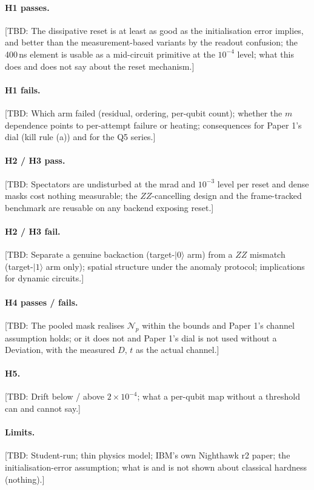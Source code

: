 \documentclass[aps,pra,reprint,superscriptaddress,nofootinbib,longbibliography,amsmath,amssymb]{revtex4-2}
\newcommand{\tbd}[1]{\textcolor{orange!80!black}{[TBD: #1]}}
\newcommand{\Np}{\mathcal{N}_p}
\begin{document}
\paragraph{H1 passes.} \tbd{The dissipative reset is at least as good as the initialisation error implies, and better than the measurement-based variants by the readout confusion; the 400\,ns element is usable as a mid-circuit primitive at the $10^{-4}$ level; what this does and does not say about the reset mechanism.}
\paragraph{H1 fails.} \tbd{Which arm failed (residual, ordering, per-qubit count); whether the $m$ dependence points to per-attempt failure or heating; consequences for Paper 1's dial (kill rule (a)) and for the Q5 series.}
\paragraph{H2 / H3 pass.} \tbd{Spectators are undisturbed at the mrad and $10^{-3}$ level per reset and dense masks cost nothing measurable; the $ZZ$-cancelling design and the frame-tracked benchmark are reusable on any backend exposing reset.}
\paragraph{H2 / H3 fail.} \tbd{Separate a genuine backaction (target-$|0\rangle$ arm) from a $ZZ$ mismatch (target-$|1\rangle$ arm only); spatial structure under the anomaly protocol; implications for dynamic circuits.}
\paragraph{H4 passes / fails.} \tbd{The pooled mask realises $\Np$ within the bounds and Paper 1's channel assumption holds; or it does not and Paper 1's dial is not used without a Deviation, with the measured $D$, $t$ as the actual channel.}
\paragraph{H5.} \tbd{Drift below / above $2\times10^{-4}$; what a per-qubit map without a threshold can and cannot say.}
\paragraph{Limits.} \tbd{Student-run; thin physics model; IBM's own Nighthawk r2 paper; the initialisation-error assumption; what is and is not shown about classical hardness (nothing).}
\end{document}

